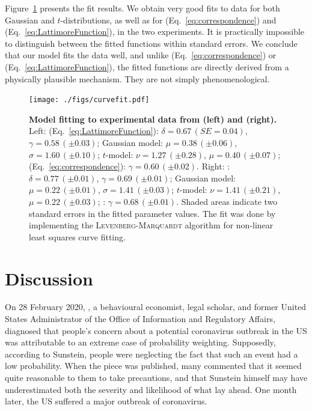 \documentclass[a4paper, 12pt]{article}
\newcommand{\person}[1]{\textsc{#1}\xspace}
\newcommand{\eref}[1]{(Eq.~\ref{eq:#1})}
\newcommand{\flabel}[1]{\label{fig:#1}}
\newcommand{\Fref}[1]{Figure~\ref{fig:#1}}
\begin{document}
\Fref{curvefit} presents the fit results. We obtain very good fits to data for both Gaussian and $t$-distributions, as well as for \eref{correspondence} and \eref{LattimoreFunction}, in the two experiments. It is practically impossible to distinguish between the fitted functions within standard errors. We conclude that our model fits the data well, and unlike \eref{correspondence} or \eref{LattimoreFunction}, the fitted functions are directly derived from a physically plausible mechanism. They are not simply phenomenological.

\begin{figure}[!htb]
\centering
\texttt{[image: ./figs/curvefit.pdf]}
\caption{\textbf{Model fitting to experimental data from \textcite{TverskyKahneman1992} (left) and \textcite{TverskyFox1995} (right).}
Left: \textcite{LattimoreBakerWitte1992} \eref{LattimoreFunction}: $\delta=0.67\,\left(SE = 0.04\right)$, $\gamma=0.58\,\left(\pm0.03\right)$; Gaussian model: $\mu=0.38\,\left(\pm0.06\right)$, $\sigma=1.60\,\left(\pm0.10\right)$; $t$-model: $\nu=1.27\,\left(\pm0.28\right)$, $\mu=0.40\,\left(\pm0.07\right)$; \textcite{TverskyKahneman1992} \eref{correspondence}: $\gamma=0.60\,\left(\pm0.02\right)$. Right: \textcite{LattimoreBakerWitte1992}: $\delta=0.77\,\left(\pm0.01\right)$, $\gamma=0.69\,\left(\pm0.01\right)$; Gaussian model: $\mu=0.22\,\left(\pm0.01\right)$, $\sigma=1.41\,\left(\pm0.03\right)$; $t$-model: $\nu=1.41\,\left(\pm0.21\right)$, $\mu=0.22\,\left(\pm0.03\right)$; \textcite{TverskyKahneman1992}: $\gamma=0.68\,\left(\pm0.01\right)$. Shaded areas indicate two standard errors in the fitted parameter values. The fit was done by implementing the \person{Levenberg-Marquardt} algorithm \parencite{Levenberg1944} for non-linear least squares curve fitting.
}
\flabel{curvefit}
\end{figure}

\section{Discussion}

On 28 February 2020, \textcite{Sunstein2020}, a behavioural economist, legal scholar, and former United States Administrator of the Office of Information and Regulatory Affairs, diagnosed that people's concern about a potential coronavirus outbreak in the US was attributable to an extreme case of probability weighting. Supposedly, according to Sunstein, people were neglecting the fact that such an event had a low probability. When the piece was published, many commented that it seemed quite reasonable to them to take precautions, and that Sunstein himself may have underestimated both the severity and likelihood of what lay ahead. One month later, the US suffered a major outbreak of coronavirus.
\end{document}
